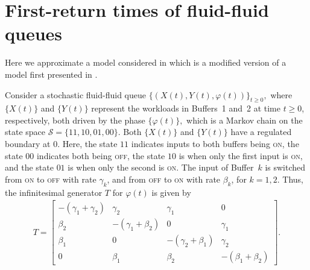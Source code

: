 \section{First-return times of fluid-fluid queues}
Here we approximate a model considered in \cite{blnos2022} which is a modified version of a model first presented in \cite{lnp13}. 
\begin{model}\label{model: ffq}
	Consider a stochastic fluid-fluid queue $\{(X(t),Y(t),\varphi(t))\}_{t\geq0},$ where $\{X(t)\}$ and $\{Y(t)\}$ represent the workloads in Buffers~1 and~2 at time $t \geq 0$, respectively, both driven by the phase $\{\varphi(t)\},$ which is a Markov chain on the state space $\mathcal{S} = \{11,10,01,00\}$. Both $\{X(t)\}$ and $\{Y(t)\}$ have a regulated boundary at 0. Here, the state $11$ indicates inputs to both buffers being \textsc{on}, the state $00$ indicates both being \textsc{off}, the state $10$ is when only the first input is \textsc{on}, and the state $01$ is when only the second is \textsc{on}. The input of Buffer~$k$ is switched from \textsc{on} to \textsc{off} with rate $\gamma_k$, and from \textsc{off} to \textsc{on} with rate $\beta_k$, for $k = 1, 2$. Thus, the infinitesimal generator $T$ for $\varphi(t)$ is given by 
	\begin{align*} 
		T = \left[ \begin{array}{cccc} -(\gamma_1 + \gamma_2) & \gamma_2 & \gamma_1 & 0 \\
							\beta_2 & -(\gamma_1 + \beta_2) & 0 & \gamma_1 \\
							\beta_1 & 0 & -(\gamma_2 + \beta_1) & \gamma_2 \\
							0 & \beta_1 &\beta_2 &-(\beta_1 + \beta_2)
	\end{array}\right].
	\end{align*} 


\end{model}
